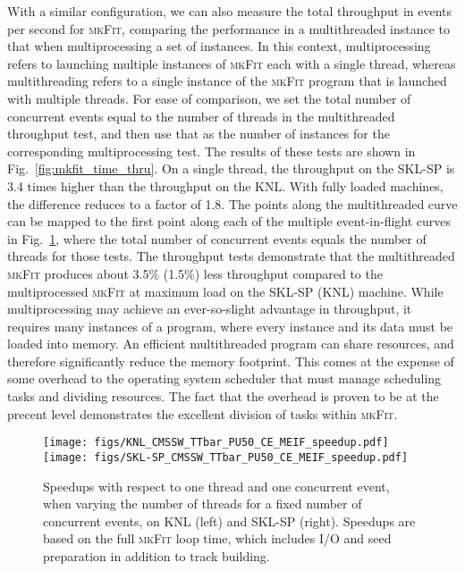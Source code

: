 \documentclass[a4paper,11pt]{article}
\newcommand{\mkFit}{\textsc{mkFit}\xspace}
\begin{document}
With a similar configuration, we can also measure the total throughput in events per second for \mkFit, comparing the performance in a multithreaded instance to that when multiprocessing a set of instances. In this context, multiprocessing refers to launching multiple instances of \mkFit each with a single thread, whereas multithreading refers to a single instance of the \mkFit program that is launched with multiple threads. For ease of comparison, we set the total number of concurrent events equal to the number of threads in the multithreaded throughput test, and then use that as the number of instances for the corresponding multiprocessing test.
The results of these tests are shown in Fig.~\ref{fig:mkfit_time_thru}.  On a single thread, the throughput on the SKL-SP is 3.4 times higher than the throughput on the KNL. With fully loaded machines, the difference reduces to a factor of 1.8. The points along the multithreaded curve can be mapped to the first point along each of the multiple event-in-flight curves in Fig.~\ref{fig:mkfit_time_meif}, where the total number of concurrent events equals the number of threads for those tests.
The throughput tests demonstrate that the multithreaded \mkFit produces about 3.5\% (1.5\%) less throughput compared to the multiprocessed \mkFit at maximum load on the SKL-SP (KNL) machine. While multiprocessing may achieve an ever-so-slight advantage in throughput, it requires many instances of a program, where every instance and its data must be loaded into memory. An efficient multithreaded program can share resources, and therefore significantly reduce the memory footprint. This  comes at the expense of some overhead to the operating system scheduler that must manage scheduling tasks and dividing resources. The fact that the overhead is proven to be at the precent level demonstrates the excellent division of tasks within \mkFit. 

\begin{figure}[htbp]
  \begin{center}
    \texttt{[image: figs/KNL\_CMSSW\_TTbar\_PU50\_CE\_MEIF\_speedup.pdf]}
    \texttt{[image: figs/SKL-SP\_CMSSW\_TTbar\_PU50\_CE\_MEIF\_speedup.pdf]}
    \caption{Speedups with respect to one thread and one concurrent event, when varying the number 
      of threads for a fixed number of concurrent events, on KNL (left) and SKL-SP
      (right). Speedups are based on the full \mkFit loop time, which includes
      I/O and seed preparation in addition to track building.}
    \label{fig:mkfit_time_meif}
  \end{center}
\end{figure}
\end{document}
